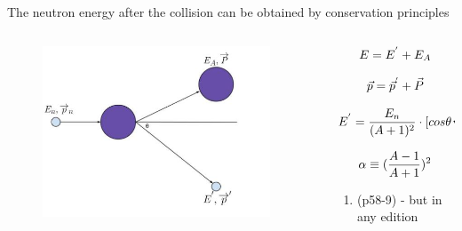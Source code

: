 \documentclass[aspectratio=1610,pdftex,dvipsnames,compress,xcolor={dvipsnames}]{beamer}
\begin{document}
\begin{frame}{The neutron energy after the collision can be obtained by conservation principles}
    \begin{columns}[t]

        \begin{column}{0.40\textwidth}
            \begin{figure}
                \centering
                \includegraphics[width=0.95\textwidth]{neutron.elastic.scattering2.jpg}
            \end{figure}
        \end{column}

        \begin{column}{0.60\textwidth}

            \begin{equation}
                \Large
                E = E^{'} + E_A
            \end{equation}

            \begin{equation}
                \Large
                \vec{p} = \vec{p}^{'} + \vec{P}
            \end{equation}

            \begin{equation}
                \Large
                E^{'} = \frac{E_n}{(A+1)^2} \cdot [cos \theta \sqrt{A^2 - sin^2 \theta}]^2
            \end{equation}

            \begin{equation}
                \Large
                \alpha \equiv (\frac{A - 1}{A + 1})^2
            \end{equation}

            \vspace*{\fill}

            \begin{enumerate}[series=outerlist,topsep=0pt,itemsep=21pt,leftmargin=*,label=(\arabic*)]
                \item[](p58-9) - but in any edition
            \end{enumerate}
        \end{column}

    \end{columns}
\end{frame}
\end{document}
